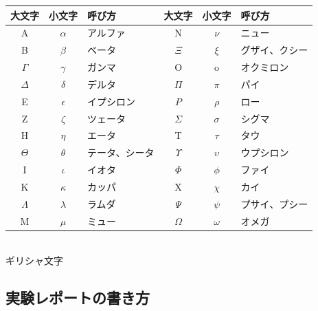 \begin{tabular}{|c|c|l|c|c|l|}
\hline
大文字&小文字&呼び方&大文字&小文字&呼び方\\
\hline
A&$\alpha$&アルファ&N&$\nu$&ニュー\\
B&$\beta$&ベータ&$\Xi$&$\xi$&グザイ、クシー\\
$\Gamma$&$\gamma$&ガンマ&O&o&オクミロン\\
$\Delta$&$\delta$&デルタ&$\Pi$&$\pi$&パイ\\
E&$\epsilon$&イプシロン&$P$&$\rho$&ロー\\
Z&$\zeta$&ツェータ&$\Sigma$&$\sigma$&シグマ\\
H&$\eta$&エータ&T&$\tau$&タウ\\
$\Theta$&$\theta$&テータ、シータ&$\Upsilon$&$\upsilon$&ウプシロン\\
I&$\iota$&イオタ&$\Phi$&$\phi$&ファイ\\
K&$\kappa$&カッパ&X&$\chi$&カイ\\
$\Lambda$&$\lambda$&ラムダ&$\Psi$&$\psi$&プサイ、プシー\\
M&$\mu$&ミュー&$\Omega$&$\omega$&オメガ\\
\hline
\end{tabular}\\
\quad ギリシャ文字 

\newpage


\subsection{実験レポートの書き方}

